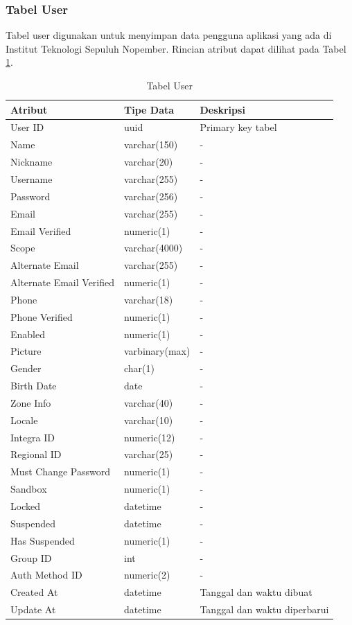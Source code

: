 \subsubsection{Tabel User}
\par Tabel user digunakan untuk menyimpan data pengguna aplikasi yang ada di Institut Teknologi Sepuluh Nopember. Rincian atribut dapat dilihat pada Tabel \ref{tabel_user}.
\begin{longtable}{|p{2cm}|p{2.5cm}|p{4.5cm}|}
 	\caption{Tabel User} \label{tabel_user} \\ \hline
    {Atribut} & {Tipe Data} & {Deskripsi} \\ \hline
    User ID & uuid & Primary key tabel \\ \hline
    Name & varchar(150) & - \\ \hline
    Nickname & varchar(20) & - \\ \hline
    Username & varchar(255) & - \\ \hline
    Password & varchar(256) & - \\ \hline
    Email & varchar(255) & - \\ \hline
    Email Verified & numeric(1) & - \\ \hline
    Scope & varchar(4000) & - \\ \hline
    Alternate Email & varchar(255) & - \\ \hline
    Alternate Email Verified & numeric(1) & - \\ \hline
    Phone & varchar(18) & - \\ \hline
    Phone Verified & numeric(1) & - \\ \hline
    Enabled & numeric(1) & - \\ \hline
    Picture & varbinary(max) & - \\ \hline
    Gender & char(1) & - \\ \hline
    Birth Date & date & - \\ \hline
    Zone Info & varchar(40) & - \\ \hline
    Locale & varchar(10) & - \\ \hline
    Integra ID & numeric(12) & - \\ \hline
    Regional ID & varchar(25) & - \\ \hline
    Must Change Password & numeric(1) & - \\ \hline
    Sandbox & numeric(1) & - \\ \hline
    Locked & datetime & - \\ \hline
    Suspended & datetime & - \\ \hline
    Has Suspended & numeric(1) & - \\ \hline
    Group ID & int & - \\ \hline
    Auth Method ID & numeric(2) & - \\ \hline
    Created At & datetime & Tanggal dan waktu dibuat \\ \hline
    Update At & datetime & Tanggal dan waktu diperbarui \\ \hline
\end{longtable}

